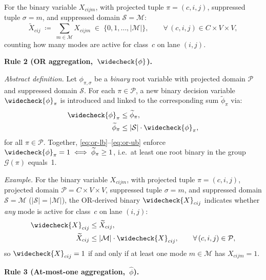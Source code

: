 \begin{convention}
For the binary variable $X_{cijm}$, with projected tuple $\pi=(c,i,j)$,
suppressed tuple $\sigma = m$, and suppressed domain $\mathcal{S}=\mathcal{M}$:
\[
  \widetilde{X}_{cij}
  \;\coloneqq\;
  \sum_{m \in \mathcal{M}} X_{cijm}
  \;\in\; \{0, 1, \dots, |\mathcal{M}|\},
  \qquad \forall\,(c,i,j) \in C \times V \times V,
\]
counting how many modes are active for class~$c$ on lane $(i,j)$.

\medskip
\noindent\textbf{Rule 2 (OR aggregation,~$\widecheck{\phi}$).}

\smallskip
\noindent\textit{Abstract definition.}
Let $\phi_{\pi,\sigma}$ be a \emph{binary} root variable with projected
domain $\mathcal{P}$ and suppressed domain $\mathcal{S}$. For each
$\pi \in \mathcal{P}$, a new binary decision variable $\widecheck{\phi}_{\pi}$
is introduced and linked to the corresponding sum $\widetilde{\phi}_{\pi}$
via:
\begin{align}
  \widecheck{\phi}_{\pi} &\leq \widetilde{\phi}_{\pi},
    \label{eq:or-lb}\\
  \widetilde{\phi}_{\pi} &\leq |\mathcal{S}|\cdot\widecheck{\phi}_{\pi},
    \label{eq:or-ub}
\end{align}
for all $\pi \in \mathcal{P}$. Together,
\eqref{eq:or-lb}--\eqref{eq:or-ub} enforce
$\widecheck{\phi}_{\pi} = 1 \iff \widetilde{\phi}_{\pi} \geq 1$, i.e.\
at least one root binary in the group $\mathcal{G}(\pi)$ equals~1.

\smallskip
\noindent\textit{Example.}
For the binary variable $X_{cijm}$, with projected tuple $\pi = (c,i,j)$,
projected domain $\mathcal{P} = C \times V \times V$, suppressed tuple
$\sigma = m$, and suppressed domain $\mathcal{S} = \mathcal{M}$
($|\mathcal{S}| = |\mathcal{M}|$), the OR-derived binary
$\widecheck{X}_{cij}$ indicates whether \emph{any} mode is active for
class~$c$ on lane $(i,j)$:
\begin{align*}
  \widecheck{X}_{cij} &\leq \widetilde{X}_{cij}, \\
  \widetilde{X}_{cij} &\leq |\mathcal{M}|\cdot\widecheck{X}_{cij},
  \qquad \forall\,(c,i,j) \in \mathcal{P},
\end{align*}
so $\widecheck{X}_{cij} = 1$ if and only if at least one mode $m \in \mathcal{M}$
has $X_{cijm} = 1$.

\medskip
\noindent\textbf{Rule 3 (At-most-one aggregation,~$\widehat{\phi}$).}


\end{convention}
